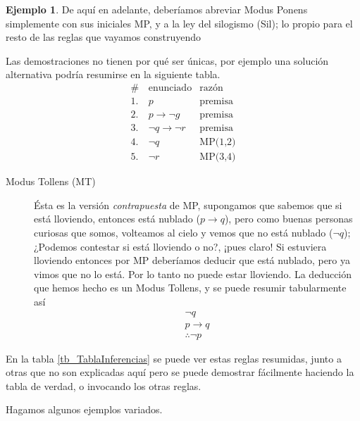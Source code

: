 \documentclass{book}
\theoremstyle{definition}
\newtheorem{ejm}{Ejemplo}[chapter]
\begin{document}
\begin{ejm}
	De aquí en adelante, deberíamos abreviar Modus Ponens simplemente con sus iniciales MP, y a la ley del silogismo (Sil); lo propio para el resto de las reglas que vayamos construyendo
	
	Las demostraciones no tienen por qué ser únicas, por ejemplo una solución alternativa podría resumirse en la siguiente tabla.
	\begin{align*}
		\# \, & \text{enunciado} & \text{razón}\\
		1.& p & \text{premisa} \\
		2.& p \rightarrow \neg g & \text{premisa}\\
		3.& \neg q \rightarrow \neg r & \text{premisa}\\
		4.& \neg q & \text{MP(1,2)}\\
		5.& \neg r & \text{MP(3,4)}
	\end{align*}
\end{ejm}
\begin{description}
	\item[Modus Tollens (MT)] Ésta es la versión \emph{contrapuesta} de MP, supongamos que sabemos que si está lloviendo, entonces está nublado ($p \rightarrow q$), pero como buenas personas curiosas que somos, volteamos al cielo y vemos que no está nublado ($\neg q$); ¿Podemos contestar si está lloviendo o no?, ¡pues claro! Si estuviera lloviendo entonces por MP deberíamos deducir que está nublado, pero ya vimos que no lo está. Por lo tanto no puede estar lloviendo. 
	La deducción que hemos hecho es un Modus Tollens, y se puede resumir tabularmente así
	\begin{equation*}\begin{split}
		\neg q \\ p \rightarrow q \\ \hline \therefore \neg p
	\end{split}	\end{equation*}
\end{description}

En la tabla \ref{tb_TablaInferencias} se puede ver estas reglas resumidas, junto a otras que no son explicadas aquí pero se puede demostrar fácilmente haciendo la tabla de verdad, o invocando los otras reglas. 

Hagamos algunos ejemplos variados.
\end{document}
